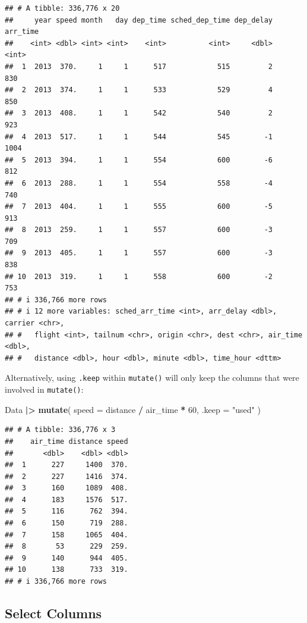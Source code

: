\documentclass[
]{book}
\newenvironment{Shaded}{\begin{snugshade}}{\end{snugshade}}
\newcommand{\AttributeTok}[1]{\textcolor[rgb]{0.13,0.29,0.53}{#1}}
\newcommand{\DecValTok}[1]{\textcolor[rgb]{0.00,0.00,0.81}{#1}}
\newcommand{\FunctionTok}[1]{\textcolor[rgb]{0.13,0.29,0.53}{\textbf{#1}}}
\newcommand{\NormalTok}[1]{#1}
\newcommand{\SpecialCharTok}[1]{\textcolor[rgb]{0.81,0.36,0.00}{\textbf{#1}}}
\newcommand{\StringTok}[1]{\textcolor[rgb]{0.31,0.60,0.02}{#1}}
\theoremstyle{definition}
\theoremstyle{definition}
\theoremstyle{definition}
\theoremstyle{definition}
\theoremstyle{remark}
\begin{document}
\begin{verbatim}
## # A tibble: 336,776 x 20
##     year speed month   day dep_time sched_dep_time dep_delay arr_time
##    <int> <dbl> <int> <int>    <int>          <int>     <dbl>    <int>
##  1  2013  370.     1     1      517            515         2      830
##  2  2013  374.     1     1      533            529         4      850
##  3  2013  408.     1     1      542            540         2      923
##  4  2013  517.     1     1      544            545        -1     1004
##  5  2013  394.     1     1      554            600        -6      812
##  6  2013  288.     1     1      554            558        -4      740
##  7  2013  404.     1     1      555            600        -5      913
##  8  2013  259.     1     1      557            600        -3      709
##  9  2013  405.     1     1      557            600        -3      838
## 10  2013  319.     1     1      558            600        -2      753
## # i 336,766 more rows
## # i 12 more variables: sched_arr_time <int>, arr_delay <dbl>, carrier <chr>,
## #   flight <int>, tailnum <chr>, origin <chr>, dest <chr>, air_time <dbl>,
## #   distance <dbl>, hour <dbl>, minute <dbl>, time_hour <dttm>
\end{verbatim}

Alternatively, using \texttt{.keep} within \texttt{mutate()} will only keep the columns that were involved in \texttt{mutate()}:

\begin{Shaded}
\begin{Highlighting}[]
\NormalTok{Data }\SpecialCharTok{|\textgreater{}} 
  \FunctionTok{mutate}\NormalTok{(}
    \AttributeTok{speed =}\NormalTok{ distance }\SpecialCharTok{/}\NormalTok{ air\_time }\SpecialCharTok{*} \DecValTok{60}\NormalTok{,}
    \AttributeTok{.keep =} \StringTok{"used"}
\NormalTok{  )}
\end{Highlighting}
\end{Shaded}

\begin{verbatim}
## # A tibble: 336,776 x 3
##    air_time distance speed
##       <dbl>    <dbl> <dbl>
##  1      227     1400  370.
##  2      227     1416  374.
##  3      160     1089  408.
##  4      183     1576  517.
##  5      116      762  394.
##  6      150      719  288.
##  7      158     1065  404.
##  8       53      229  259.
##  9      140      944  405.
## 10      138      733  319.
## # i 336,766 more rows
\end{verbatim}

\hypertarget{select-columns}{%
\subsection{Select Columns}\label{select-columns}}
\end{document}
